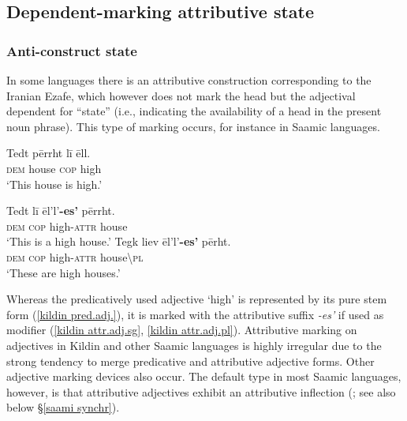 \subsection{Dependent\hyp{}marking attributive state}
\label{dep-marking state}
\subsubsection{Anti\hyp{}construct state} 
In some languages there is an attributive construction corresponding to the Iranian Ezafe, which however does not mark the head but the adjectival dependent for “state” (i.e., indicating the availability of a head in the present noun phrase). This type of marking occurs, for instance in Saamic languages.

\newpage 
\begin{exe}
\ex
{}
\begin{xlist}
\label{kildin pred.adj.}
\begin{xlist}
\ex
\gll Tedt 	pērrht lī ēll.\\
	\textsc{dem} house \textsc{cop} high\\
\glt	‘This house is high.’
\end{xlist}
\begin{xlist}
\ex	
\label{kildin attr.adj.sg}
\gll Tedt	lī 	ēl'l'\textbf{-es'} 		pērrht.\\
	\textsc{dem} \textsc{cop}	high-\textsc{attr}	house\\
\glt	‘This is a high house.’
\ex	
\label{kildin attr.adj.pl}
\gll Tegk 	liev 	ēl'l'\textbf{-es'}		pērht.\\	
	\textsc{dem}	\textsc{cop}	high-\textsc{attr} house\textbackslash\textsc{pl}\\
\glt	‘These are high houses.’
\end{xlist}
\end{xlist}
\end{exe}
Whereas the predicatively used adjective ‘high’ is represented by its pure stem form (\ref{kildin pred.adj.}), it is marked with the attributive suffix \textit{-es'} if used as modifier (\ref{kildin attr.adj.sg}, \ref{kildin attr.adj.pl}). Attributive marking on adjectives in Kildin and other Saamic languages is highly irregular due to the strong tendency to merge predicative and attributive adjective forms. Other adjective marking devices also occur. The default type in most Saamic languages, however, is that attributive adjectives exhibit an attributive inflection (\citealt{riesler2006b}; see also below \S\ref{saami synchr}).

